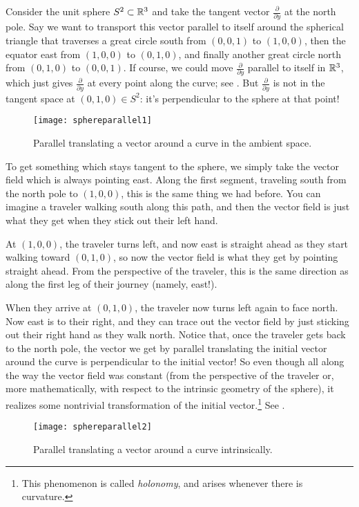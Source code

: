 \begin{example}
	Consider the unit sphere $S^2 \subset \mathbb{R}^3$ and take the tangent vector $\frac{\partial}{\partial y}$ at the north pole. Say we want to transport this vector parallel to itself around the spherical triangle that traverses a great circle south from $(0,0,1)$ to $(1,0,0)$, then the equator east from $(1,0,0)$ to $(0,1,0)$, and finally another great circle north from $(0,1,0)$ to $(0,0,1)$. If course, we could move $\frac{\partial}{\partial y}$ parallel to itself in $\mathbb{R}^3$, which just gives $\frac{\partial}{\partial y}$ at every point along the curve; see . But $\frac{\partial}{\partial y}$ is not in the tangent space at $(0,1,0) \in S^2$: it's perpendicular to the sphere at that point!
	
	\begin{figure}[htbp]
		\centering
			\texttt{[image: sphereparallel1]}
		\caption{Parallel translating a vector around a curve in the ambient space.}
		\label{fig:sphereparallel1}
	\end{figure}
	
	To get something which stays tangent to the sphere, we simply take the vector field which is always pointing east. Along the first segment, traveling south from the north pole to $(1,0,0)$, this is the same thing we had before. You can imagine a traveler walking south along this path, and then the vector field is just what they get when they stick out their left hand.
	
	At $(1,0,0)$, the traveler turns left, and now east is straight ahead as they start walking toward $(0,1,0)$, so now the vector field is what they get by pointing straight ahead. From the perspective of the traveler, this is the same direction as along the first leg of their journey (namely, east!).
	
	When they arrive at $(0,1,0)$, the traveler now turns left again to face north. Now east is to their right, and they can trace out the vector field by just sticking out their right hand as they walk north. Notice that, once the traveler gets back to the north pole, the vector we get by parallel translating the initial vector around the curve is perpendicular to the initial vector! So even though all along the way the vector field was constant (from the perspective of the traveler or, more mathematically, with respect to the intrinsic geometry of the sphere), it realizes some nontrivial transformation of the initial vector.\footnote{This phenomenon is called \emph{holonomy}, and arises whenever there is curvature.} See .
	
	\begin{figure}[htbp]
		\centering
			\texttt{[image: sphereparallel2]}
		\caption{Parallel translating a vector around a curve intrinsically.}
		\label{fig:sphereparallel2}
	\end{figure}
\end{example}

